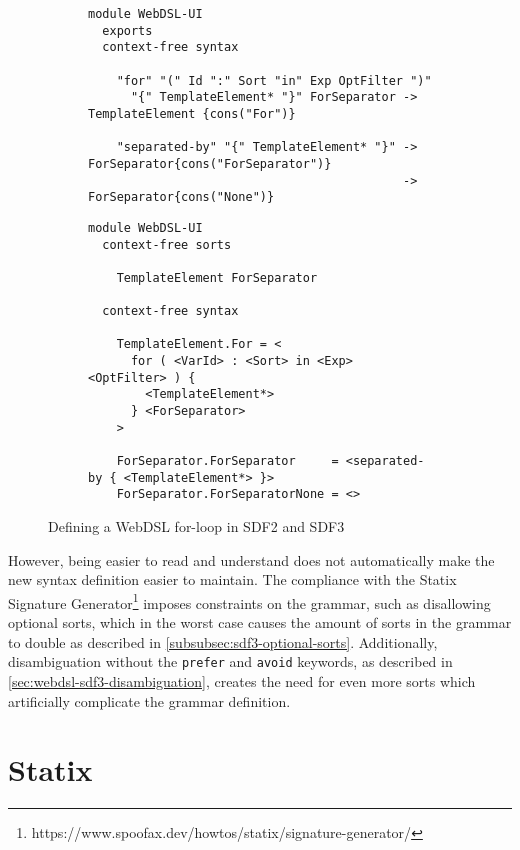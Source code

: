     \begin{figure}
      \begin{subfigure}[b]{1\textwidth}
        \begin{verbatim}
module WebDSL-UI
  exports
  context-free syntax

    "for" "(" Id ":" Sort "in" Exp OptFilter ")"
      "{" TemplateElement* "}" ForSeparator -> TemplateElement {cons("For")}

    "separated-by" "{" TemplateElement* "}" -> ForSeparator{cons("ForSeparator")}
                                            -> ForSeparator{cons("None")}
        \end{verbatim}
        \caption{\label{fig:sdf3-maintainability-1-sdf2}}
      \end{subfigure}
      \begin{subfigure}[b]{1\textwidth}
        \begin{verbatim}
module WebDSL-UI
  context-free sorts

    TemplateElement ForSeparator

  context-free syntax

    TemplateElement.For = <
      for ( <VarId> : <Sort> in <Exp> <OptFilter> ) {
        <TemplateElement*>
      } <ForSeparator>
    >

    ForSeparator.ForSeparator     = <separated-by { <TemplateElement*> }>
    ForSeparator.ForSeparatorNone = <>
        \end{verbatim}
        \caption{\label{fig:sdf3-maintainability-1-sdf3}}
      \end{subfigure}
      \caption{\label{fig:sdf3-maintainability-1}Defining a WebDSL for-loop in SDF2 and SDF3}
    \end{figure}

    However, being easier to read and understand does not automatically make the new syntax definition easier to maintain. The compliance with the Statix Signature Generator\footnote{https://www.spoofax.dev/howtos/statix/signature-generator/} imposes constraints on the grammar, such as disallowing optional sorts, which in the worst case causes the amount of sorts in the grammar to double as described in \cref{subsubsec:sdf3-optional-sorts}. Additionally, disambiguation without the \texttt{prefer} and \texttt{avoid} keywords, as described in \cref{sec:webdsl-sdf3-disambiguation}, creates the need for even more sorts which artificially complicate the grammar definition.

\section{\label{sec:eval-statix}Statix}

